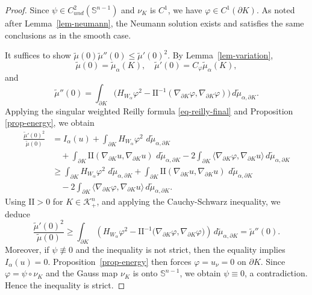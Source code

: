 \documentclass[10pt,a4paper]{amsart}
\newcommand{\dd}{\,d}
\begin{document}
\begin{proof}
  Since $\psi\in C^2_{und}(\mathbb{S}^{n-1})$ and $\nu_K$ is $C^1$, we
  have $\varphi\in C^1(\partial K)$. As noted after
  Lemma~\ref{lem-neumann}, the Neumann solution exists and satisfies
  the same conclusions as in the smooth case.

  It suffices to show $\tilde{\mu}(0)\tilde{\mu}''(0)\le\tilde{\mu}'(0)^2$.
  By Lemma~\ref{lem-variation},
  \[
    \tilde{\mu}(0)=\tilde{\mu}_\alpha(K),\quad\tilde{\mu}'(0)=C_\varphi\tilde{\mu}_\alpha(K),
  \]
  and
  \[
  \tilde{\mu}''(0)=\int_{\partial K}\bigl(H_{W_\alpha}\varphi^2-\mathrm{II}^{-1}(\nabla_{\partial K}\varphi,\nabla_{\partial K}\varphi)\bigr)\,d\tilde{\mu}_{\alpha,\partial K}.
  \]
  Applying the singular weighted Reilly formula \eqref{eq-reilly-final} and Proposition \ref{prop-energy}, we obtain
   \begin{align*}
    \frac{\tilde{\mu}'(0)^2}{\tilde{\mu}(0)}
    &=
    I_\alpha(u)
    +
    \int_{\partial K}
      H_{W_\alpha}\varphi^2\,
      \dd\tilde{\mu}_{\alpha,\partial K}  \\
    &\quad
    +
    \int_{\partial K}
      \mathrm{II}(\nabla_{\partial K}u,\nabla_{\partial K}u)\,
      \dd\tilde{\mu}_{\alpha,\partial K}
    -
    2\int_{\partial K}
      \big\langle
        \nabla_{\partial K}\varphi,
        \nabla_{\partial K}u
      \big\rangle
      \dd\tilde{\mu}_{\alpha,\partial K}  \\
    &\ge
    \int_{\partial K}
      H_{W_\alpha}\varphi^2\,
      \dd\tilde{\mu}_{\alpha,\partial K}
    +
    \int_{\partial K}
      \mathrm{II}(\nabla_{\partial K}u,\nabla_{\partial K}u)\,
      \dd\tilde{\mu}_{\alpha,\partial K}       \\
    &\quad
    -
    2\int_{\partial K}
      \big\langle
        \nabla_{\partial K}\varphi,
        \nabla_{\partial K}u
      \big\rangle
      \dd\tilde{\mu}_{\alpha,\partial K}.
  \end{align*}
  Using $\mathrm{II}>0$ for $K\in\mathcal{K}_{+}^n$, and applying the Cauchy-Schwarz inequality, we deduce
    \[
    \frac{\tilde{\mu}'(0)^2}{\tilde{\mu}(0)}
    \ge
    \int_{\partial K}
    \left(
      H_{W_\alpha}\varphi^2
      -
      \mathrm{II}^{-1}
      \bigl(
        \nabla_{\partial K}\varphi,
        \nabla_{\partial K}\varphi
      \bigr)
    \right)
    \dd\tilde{\mu}_{\alpha,\partial K}
    =\tilde{\mu}''(0).
  \]
  Moreover, if $\psi\not\equiv0$ and the inequality is not strict, then the equality implies $I_\alpha(u)=0$. Proposition~\ref{prop-energy} then forces $\varphi = u_\nu = 0$ on $\partial K$. Since $\varphi = \psi \circ \nu_K$ and the Gauss map $\nu_K$ is onto $\mathbb{S}^{n-1}$, we obtain $\psi \equiv 0$, a contradiction. Hence the inequality is strict.
\end{proof}
\end{document}

